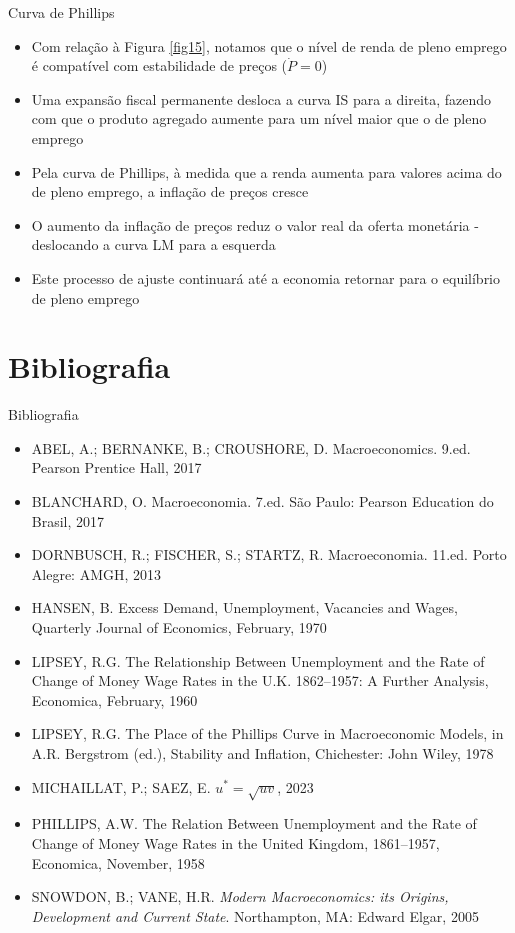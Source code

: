 \documentclass[10pt]{beamer}
\begin{document}
\begin{frame}{Curva de Phillips}
    \begin{itemize}
        \item Com relação à Figura \ref{fig15}, notamos que o nível de renda de pleno emprego é compatível com estabilidade de preços ($\dot{P} = 0$)
        \bigskip
        \item Uma expansão fiscal permanente desloca a curva IS para a direita, fazendo com que o produto agregado aumente para um nível maior que o de pleno emprego
        \bigskip
        \item Pela curva de Phillips, à medida que a renda aumenta para valores acima do de pleno emprego, a inflação de preços cresce
        \bigskip
        \item O aumento da inflação de preços reduz o valor real da oferta monetária - deslocando a curva LM para a esquerda
        \bigskip
        \item Este processo de ajuste continuará até a economia retornar para o equilíbrio de pleno emprego
    \end{itemize}
\end{frame}

\section{Bibliografia}
\begin{frame}{ Bibliografia}
    \begin{itemize}                        
        \item ABEL, A.; BERNANKE, B.; CROUSHORE, D. Macroeconomics. 9.ed. Pearson Prentice Hall, 2017\medskip
        \item BLANCHARD, O. Macroeconomia. 7.ed. São Paulo: Pearson Education do Brasil, 2017\medskip
        \item DORNBUSCH, R.; FISCHER, S.; STARTZ, R. Macroeconomia. 11.ed. Porto Alegre: AMGH, 2013 \medskip
        \item HANSEN, B. Excess Demand, Unemployment, Vacancies and Wages, Quarterly Journal of Economics, February, 1970\medskip
        \item LIPSEY, R.G. The Relationship Between Unemployment and the Rate of Change of Money Wage Rates in the U.K. 1862–1957: A Further Analysis, Economica, February, 1960\medskip
        \item LIPSEY, R.G. The Place of the Phillips Curve in Macroeconomic Models, in A.R. Bergstrom (ed.), Stability and Inflation, Chichester: John Wiley, 1978\medskip
        \item MICHAILLAT, P.; SAEZ, E. \href{https://pascalmichaillat.org/13.pdf}{$u^* = \sqrt{uv}$}, 2023\medskip
        \item PHILLIPS, A.W. The Relation Between Unemployment and the Rate of Change of Money Wage Rates in the United Kingdom, 1861–1957, Economica, November, 1958\medskip
        \item SNOWDON, B.; VANE, H.R. \emph{Modern Macroeconomics: its Origins, Development and Current State}. Northampton, MA: Edward Elgar, 2005\medskip        
    \end{itemize}
\end{frame}
\end{document}
